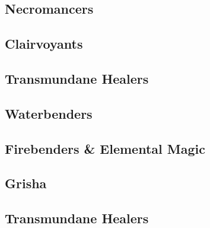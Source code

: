 \documentclass{LegrandOrangeTufteBook}
\begin{document}
\subsection*{Necromancers}

\subsection*{Clairvoyants}

\subsection*{Transmundane Healers}

\subsection*{Waterbenders}

\subsection*{Firebenders \& Elemental Magic}

\subsection*{Grisha}

\subsection*{Transmundane Healers}
\end{document}
